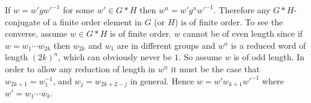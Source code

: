 \documentclass[10pt]{article}
\begin{document}
\begin{enumerate}
If $w = w' g w'^{-1}$ for some $w' \in G \ast H$ then $w^n = w' g^nw'^{-1}$.  Therefore any $G \ast H$-conjugate of a finite order element in $G$ (or $H$) is of finite order.  To see the converse, assume $w \in G \ast H$ is of finite order.  $w$ cannot be of even length since if $w = w_1 \cdots w_{2k}$ then $w_{2k}$ and $w_1$ are in different groups and $w^n$ is a reduced word of length $(2k)^n$, which can obviously never be $1$.  So assume $w$ is of odd length.  In order to allow any reduction of length in $w^n$ it must be the case that $w_{2k+1} = w_1^{-1}$, and $w_{j} = w_{2k+2-j}$ in general.  Hence $w = w' w_{k+1} w'^{-1}$ where $w' = w_1 \cdots w_k$.

\end{enumerate}
\end{document}
